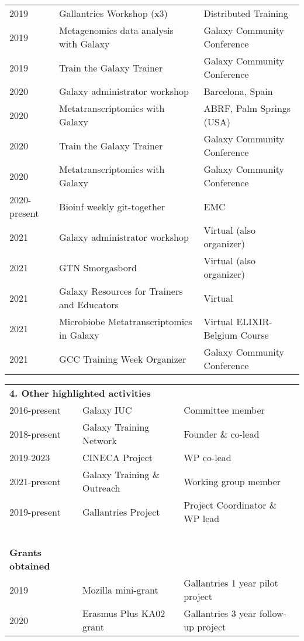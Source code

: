 \begin{table}[h!]
\begin{tabular}{lll}
        2019 & Gallantries Workshop (x3)                       & Distributed Training \\
        2019 & Metagenomics data analysis with Galaxy          & Galaxy Community Conference \\
        2019 & Train the Galaxy Trainer                        & Galaxy Community Conference \\
        2020 & Galaxy administrator workshop                   & Barcelona, Spain \\
        2020 & Metatranscriptomics with Galaxy                 & ABRF, Palm Springs (USA) \\
        2020 & Train the Galaxy Trainer                        & Galaxy Community Conference \\
        2020 & Metatranscriptomics with Galaxy                 & Galaxy Community Conference \\
        2020-present & Bioinf weekly git-together              & EMC \\
        2021 & Galaxy administrator workshop                   & Virtual (also organizer) \\
        2021 & GTN Smorgasbord                                 & Virtual (also organizer) \\
        2021 & Galaxy Resources for Trainers and Educators     & Virtual  \\
        2021 & Microbiobe Metatranscriptomics in Galaxy        & Virtual ELIXIR-Belgium Course \\
        2021 & GCC Training Week Organizer                     & Galaxy Community Conference \\
    \end{tabular}
\end{table}

\begin{table}
    \begin{tabular}{lll}

        \multicolumn{3}{l}{\textbf{4.  Other highlighted activities}} \\
        2016-present & Galaxy IUC & Committee member \\
        2018-present & Galaxy Training Network & Founder \& co-lead  \\
        2019-2023 & CINECA Project & WP co-lead  \\
        2021-present & Galaxy Training \& Outreach& Working group member \\
        2019-present & Gallantries Project & Project Coordinator \& WP lead \\
        \ \\
        \textbf{Grants obtained} \\
         2019 & Mozilla mini-grant& Gallantries 1 year pilot project  \\
         2020 & Erasmus Plus KA02 grant & Gallantries 3 year follow-up project \\
    \end{tabular}
\end{table}



\normalsize
